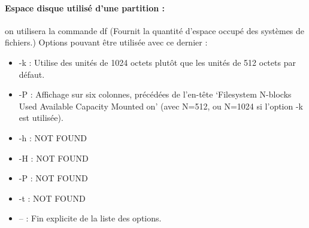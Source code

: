 \documentclass{article}[12pt]
\begin{document}
\paragraph{Espace disque utilisé d'une partition : } on utilisera la commande df (Fournit la quantité d'espace occupé des systèmes de fichiers.) Options pouvant être utilisée avec ce dernier :
\begin{itemize}
\item -k : Utilise des unités de 1024 octets plutôt que les unités de 512 octets par défaut.
\item -P : Affichage sur six colonnes, précédées de l'en-tête `Filesystem N-blocks Used Available Capacity Mounted on' (avec N=512, ou N=1024 si l'option -k est utilisée).
\item -h : NOT FOUND
\item -H : NOT FOUND
\item -P : NOT FOUND
\item -t : NOT FOUND
\item -- : Fin explicite de la liste des options.
\end{itemize}
\end{document}
